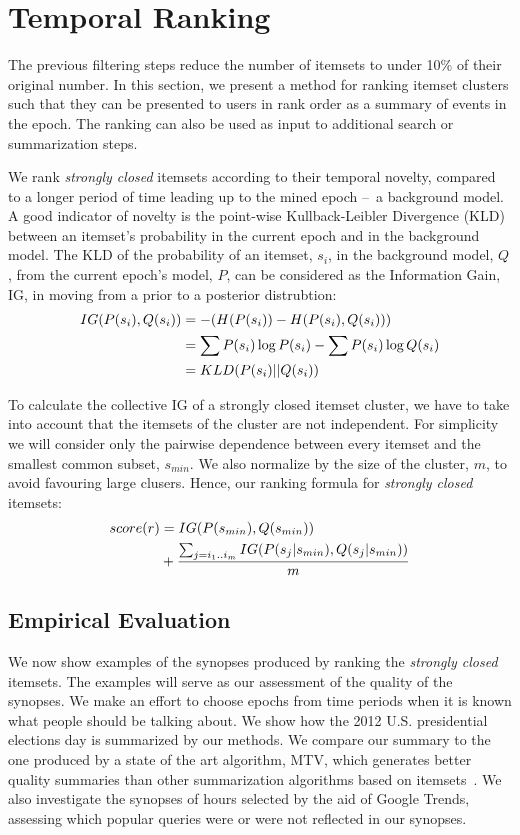 \documentclass{sig-alternate}
\begin{document}
\section{Temporal Ranking}
\label{sec:rank}
The previous filtering steps reduce the number of itemsets to 
under 10\% of their original number.
In this section, we present a method for ranking itemset clusters 
such that they can
be presented to users in rank order
as a summary of events in the epoch.
The ranking can also be
used as input to additional search or
summarization steps.

We rank \emph{strongly closed} itemsets according 
to their temporal novelty,
compared to 
a longer period of time 
leading up to the mined epoch
--~a background model.
A good indicator of novelty is the point-wise Kullback-Leibler Divergence (KLD)
between an itemset's probability in the current epoch and in the background model.
The KLD of the probability of an itemset, $s_i$, in the background
model, $Q$, from the current epoch's model, $P$, can be considered as
the Information Gain, IG, in moving from a prior to a posterior distrubtion: 
\begin{align}IG(P(s_i),Q(s_i))  &= - (H(P(s_i)) - H(P(s_i),Q(s_i))) \notag\\ &= \sum{P(s_i) \log{P(s_i)}} - \sum{P(s_i) \log{Q(s_i)}} \notag\\ &= KLD(P(s_i)||Q(s_i))\end{align}

To calculate the collective IG of a strongly closed itemset cluster,
we have to take into account that the itemsets of the cluster are not independent. 
For simplicity we will consider only the pairwise dependence between 
every itemset and the smallest common subset, $s_{min}$.
We also normalize by the size of the cluster, $m$, to avoid favouring large clusers. Hence, our ranking formula for
\emph{strongly closed} itemsets:
\begin{align}\label{eq:avgIG}score(r) &= IG(P(s_{min}), Q(s_{min})) \notag\\ &+ \frac{ \sum_{ j = i_1..i_m } { IG(P(s_j|s_{min}), Q(s_j|s_{min})) } } { m } \end{align}


\subsection{Empirical Evaluation}
\label{sec:empirical}
We now show examples of the synopses produced by ranking
the \emph{strongly closed} itemsets. 
The examples will serve as our assessment of the quality of 
the synopses. 
We make an effort to choose epochs from time periods when 
it is known what people should be talking about. 
We show how the 2012 U.S. presidential elections day is summarized by our methods. %
We compare our summary to the one produced by a state of the art algorithm, MTV,
which generates better quality summaries than other summarization algorithms based on itemsets~\cite{mampaey2011tell}. 
We also investigate the synopses of hours selected by the aid of Google Trends,
assessing which popular queries were or were not reflected in our synopses.
\end{document}
